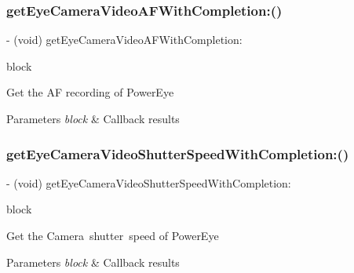 \subsubsection{\texorpdfstring{get\+Eye\+Camera\+Video\+A\+F\+With\+Completion\+:()}{getEyeCameraVideoAFWithCompletion:()}}
{\footnotesize\ttfamily -\/ (void) get\+Eye\+Camera\+Video\+A\+F\+With\+Completion\+: \begin{DoxyParamCaption}\item[{(void($^\wedge$)(P\+V\+Camera\+Video\+AF video\+AF, N\+S\+Error $\ast$\hyperlink{group___p_v_s_d_k___c_o_r_e___a_p_i___m_o_u_n_t_c_o_n_t_r_o_l_ga5a1de33b230662127568783314b4a54d}{\+\_\+\+Nullable} error))}]{block }\end{DoxyParamCaption}}

Get the AF recording of Power\+Eye


\begin{DoxyParams}{Parameters}
{\em block} & Callback results \\
\hline
\end{DoxyParams}
\mbox{\label{interface_p_v_camera_a56785f881bffc7ecf9d1a2824b2cc818}} 
\subsubsection{\texorpdfstring{get\+Eye\+Camera\+Video\+Shutter\+Speed\+With\+Completion\+:()}{getEyeCameraVideoShutterSpeedWithCompletion:()}}
{\footnotesize\ttfamily -\/ (void) get\+Eye\+Camera\+Video\+Shutter\+Speed\+With\+Completion\+: \begin{DoxyParamCaption}\item[{(void($^\wedge$)(P\+V\+Camera\+Video\+Shutter\+Speed video\+Shutter\+Speed, N\+S\+Error $\ast$\hyperlink{group___p_v_s_d_k___c_o_r_e___a_p_i___m_o_u_n_t_c_o_n_t_r_o_l_ga5a1de33b230662127568783314b4a54d}{\+\_\+\+Nullable} error))}]{block }\end{DoxyParamCaption}}

Get the Camera shutter speed of Power\+Eye


\begin{DoxyParams}{Parameters}
{\em block} & Callback results \\
\hline
\end{DoxyParams}
\mbox{\label{interface_p_v_camera_a38ce88a0cb230800a798f84157d079c6}} 

